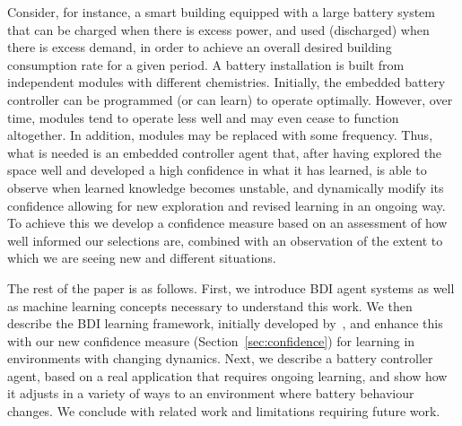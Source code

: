 Consider, for instance, a smart building equipped with a large
battery system that can be charged when there is excess power, and
used (discharged) when there is excess demand, in order to
achieve an overall desired building consumption rate for a given
period. A battery installation is built from independent modules with
different chemistries. Initially, the embedded battery controller can
be programmed (or can learn) to operate optimally. However, over time,
modules tend to operate less well and may even
cease to function altogether. In addition, modules may be replaced
with some frequency.   
Thus, what is needed is an embedded controller agent that, after having explored
the space well and developed a high confidence in what it has learned,
is able to observe when learned knowledge becomes unstable, and
dynamically modify its confidence allowing for new exploration and
revised learning in an ongoing way. To achieve this we develop a
confidence measure based on an assessment of how well informed our
selections are, combined with an observation of the extent to which we
are seeing new and different situations.

The rest of the paper is as follows.
%
First, we introduce BDI agent systems as well as machine learning
concepts necessary to understand this work.  
%
We then describe the BDI learning framework, initially developed
by~\cite{airiau09:enhancing,singh10:extending,singh10:learning}, and
enhance this with our new confidence measure (Section~\ref{sec:confidence})
for learning in environments with changing dynamics.  
%
Next, we describe a battery controller agent, based on a real
application that requires ongoing learning, and show how it adjusts in
a variety of ways to an environment where battery behaviour changes.  
%
We conclude with related work and limitations requiring future work.




